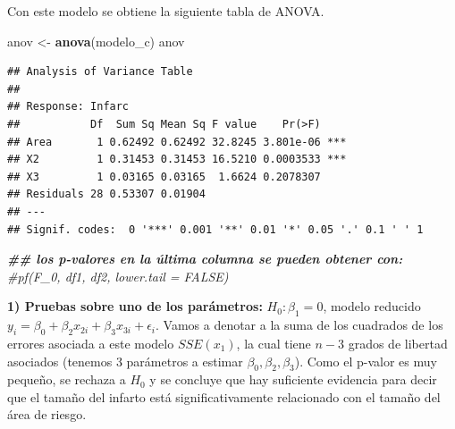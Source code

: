 \documentclass[
]{book}
\newenvironment{Shaded}{\begin{snugshade}}{\end{snugshade}}
\newcommand{\AttributeTok}[1]{\textcolor[rgb]{0.13,0.29,0.53}{#1}}
\newcommand{\CommentTok}[1]{\textcolor[rgb]{0.56,0.35,0.01}{\textit{#1}}}
\newcommand{\DecValTok}[1]{\textcolor[rgb]{0.00,0.00,0.81}{#1}}
\newcommand{\DocumentationTok}[1]{\textcolor[rgb]{0.56,0.35,0.01}{\textbf{\textit{#1}}}}
\newcommand{\FunctionTok}[1]{\textcolor[rgb]{0.13,0.29,0.53}{\textbf{#1}}}
\newcommand{\NormalTok}[1]{#1}
\newcommand{\OtherTok}[1]{\textcolor[rgb]{0.56,0.35,0.01}{#1}}
\newcommand{\SpecialCharTok}[1]{\textcolor[rgb]{0.81,0.36,0.00}{\textbf{#1}}}
\newcommand{\StringTok}[1]{\textcolor[rgb]{0.31,0.60,0.02}{#1}}
\begin{document}
Con este modelo se obtiene la siguiente tabla de ANOVA.

\begin{Shaded}
\begin{Highlighting}[]
\NormalTok{anov }\OtherTok{\textless{}{-}} \FunctionTok{anova}\NormalTok{(modelo\_c)}
\NormalTok{anov}
\end{Highlighting}
\end{Shaded}

\begin{verbatim}
## Analysis of Variance Table
## 
## Response: Infarc
##           Df  Sum Sq Mean Sq F value    Pr(>F)    
## Area       1 0.62492 0.62492 32.8245 3.801e-06 ***
## X2         1 0.31453 0.31453 16.5210 0.0003533 ***
## X3         1 0.03165 0.03165  1.6624 0.2078307    
## Residuals 28 0.53307 0.01904                      
## ---
## Signif. codes:  0 '***' 0.001 '**' 0.01 '*' 0.05 '.' 0.1 ' ' 1
\end{verbatim}

\begin{Shaded}
\begin{Highlighting}[]
\DocumentationTok{\#\# los p{-}valores en la última columna se pueden obtener con: }
\CommentTok{\#pf(F\_0, df1, df2, lower.tail = FALSE)}
\end{Highlighting}
\end{Shaded}

\textbf{1) Pruebas sobre uno de los parámetros:} \(H_0:\beta_1=0\), modelo reducido \(y_i = \beta_0  +\beta_2x_{2i} + \beta_3x_{3i}+\epsilon_i\). Vamos a denotar a la suma de los cuadrados de los errores asociada a este modelo \(SSE(x_1)\), la cual tiene \(n-3\) grados de libertad asociados (tenemos 3 parámetros a estimar \(\beta_0,\beta_2,\beta_3\)). Como el p-valor es muy pequeño, se rechaza a \(H_0\) y se concluye que hay suficiente evidencia para decir que el tamaño del infarto está significativamente relacionado con el tamaño del área de riesgo.

\begin{Shaded}
\end{Shaded}
\end{document}

